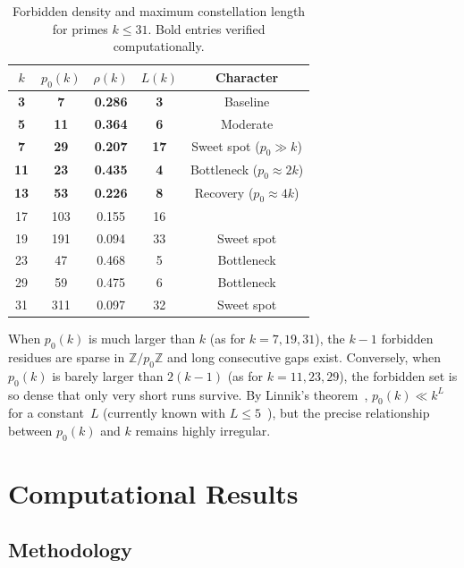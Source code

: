 \documentclass[11pt,a4paper]{article}
\newcommand{\ZZ}{\mathbb{Z}}
\begin{document}
\begin{table}[ht]
\centering
\caption{Forbidden density and maximum constellation length for primes $k \le 31$. Bold entries verified computationally.}\label{tab:density}
\smallskip
\begin{tabular}{ccccc}
\toprule
$k$ & $p_0(k)$ & $\rho(k)$ & $L(k)$ & Character \\
\midrule
\textbf{3}  & \textbf{7}   & \textbf{0.286} & \textbf{3}  & Baseline \\
\textbf{5}  & \textbf{11}  & \textbf{0.364} & \textbf{6}  & Moderate \\
\textbf{7}  & \textbf{29}  & \textbf{0.207} & \textbf{17} & Sweet spot ($p_0 \gg k$) \\
\textbf{11} & \textbf{23}  & \textbf{0.435} & \textbf{4}  & Bottleneck ($p_0 \approx 2k$) \\
\textbf{13} & \textbf{53}  & \textbf{0.226} & \textbf{8}  & Recovery ($p_0 \approx 4k$) \\
17 & 103 & 0.155 & 16 & \\
19 & 191 & 0.094 & 33 & Sweet spot \\
23 & 47  & 0.468 & 5  & Bottleneck \\
29 & 59  & 0.475 & 6  & Bottleneck \\
31 & 311 & 0.097 & 32 & Sweet spot \\
\bottomrule
\end{tabular}
\end{table}

When $p_0(k)$ is much larger than $k$ (as for $k = 7, 19, 31$), the $k-1$ forbidden residues are sparse in $\ZZ/p_0\ZZ$ and long consecutive gaps exist. Conversely, when $p_0(k)$ is barely larger than $2(k-1)$ (as for $k = 11, 23, 29$), the forbidden set is so dense that only very short runs survive. By Linnik's theorem~\cite{linnik}, $p_0(k) \ll k^L$ for a constant~$L$ (currently known with $L \le 5$~\cite{xylouris}), but the precise relationship between $p_0(k)$ and $k$ remains highly irregular.

\section{Computational Results}

\subsection{Methodology}
\end{document}
